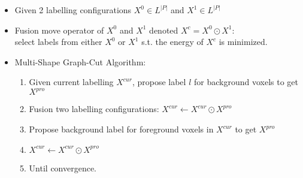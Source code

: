 \documentclass[11pt, a4paper, landscape]{article}
\begin{document}
\NewPage{}
\vfill
\begin{itemize}
\item Given 2 labelling configurations $X^0 \in L^{\lvert P \rvert}$ and $X^1 \in L^{\lvert P \rvert}$
\item Fusion move operator of $X^0$ and $X^1$ denoted $X^c = X^0 \odot X^1$:\\
select labels from either $X^0$ or $X^1$ s.t. the energy of $X^c$ is minimized.
\vfill
\item Multi-Shape Graph-Cut Algorithm:
\begin{enumerate}
\item Given current labelling $X^{cur}$, propose label $l$ for background voxels to get $X^{pro}$
\item Fusion two labelling configurations: $X^{cur} \leftarrow X^{cur} \odot X^{pro}$
\item Propose background label for foreground voxels in $X^{cur}$ to get $X^{pro}$
\item $X^{cur} \leftarrow X^{cur} \odot X^{pro}$
\item Until convergence.
\end{enumerate}
\end{itemize}
\vfill
\end{document}
